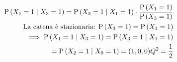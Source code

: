 \begin{enumerate}
	\[ \begin{aligned}
	\text{P}\left(X_1 = 1 \mid X_3 = 1\right) = \text{P}\left(X_3 = 1 \mid X_1 = 1\right) \cdot \dfrac{\text{P}\left(X_1 = 1\right)}{\text{P}\left(X_3 = 1\right)} \\
	\text{La catena è stazionaria: } \text{P}\left(X_3 = 1\right) = \text{P}\left(X_1 = 1\right) \\
	\implies \text{P}\left(X_1 = 1 \mid X_3 = 1\right) = \text{P}\left(X_3 = 1 \mid X_1 = 1\right) \\ 
	= \text{P}\left(X_2 = 1 \mid X_0 = 1\right) = (1, 0, 0) Q^2 = \dfrac{1}{2}
	\end{aligned} \]
\end{enumerate}

